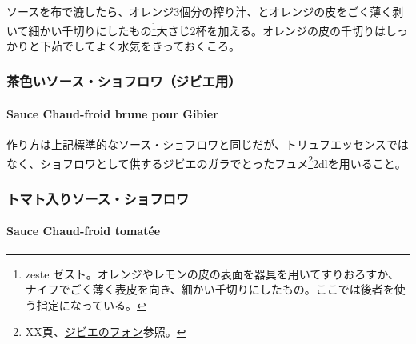 \documentclass[twoside,12Q,b5j]{escoffierltjsbook}
\newenvironment{recette}{\begin{small}\begin{spacing}{1}\begin{multicols}{2}}{\end{multicols}\end{spacing}\end{small}}
\begin{document}
\begin{recette}
ソースを布で漉したら、オレンジ3個分の搾り汁、とオレンジの皮をごく薄く剥いて細かい千切りにしたもの\footnote{zeste
  ゼスト。オレンジやレモンの皮の表面を器具を用いてすりおろすか、ナイフでごく薄く表皮を向き、細かい千切りにしたもの。ここでは後者を使う指定になっている。}大さじ2杯を加える。オレンジの皮の千切りはしっかりと下茹でしてよく水気をきっておくころ。

\vspace*{1.7\zw}

\subsubsection{茶色いソース・ショフロワ（ジビエ用）}\label{ux8336ux8272ux3044ux30bdux30fcux30b9ux30b7ux30e7ux30d5ux30edux30efux30b8ux30d3ux30a8ux7528}

\paragraph{Sauce Chaud-froid brune pour
Gibier}\label{sauce-chaud-froid-brune-pour-gibier}


作り方は上記\protect\hyperlink{sauce-chaud-froid-brune}{標準的なソース・ショフロワ}と同じだが、トリュフエッセンスではなく、ショフロワとして供するジビエのガラでとったフュメ\footnote{XX頁、\protect\hyperlink{fonds-de-gibier}{ジビエのフォン}参照。}2dlを用いること。

\vspace*{1.7\zw}

\subsubsection{トマト入りソース・ショフロワ}\label{ux30c8ux30deux30c8ux5165ux308aux30bdux30fcux30b9ux30b7ux30e7ux30d5ux30edux30ef}

\paragraph{Sauce Chaud-froid tomatée}\label{sauce-chaud-froid-tomatee}



\end{recette}
\end{document}
